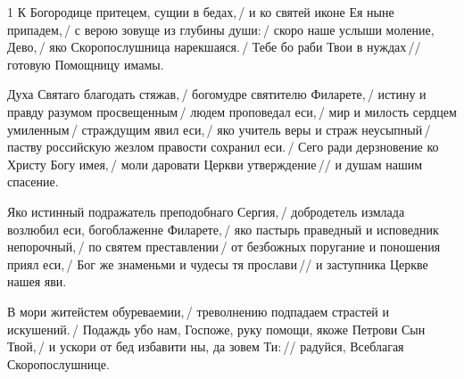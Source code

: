 


\begin{hangparas}{\hpindent}{1}
\large
{}
К Богородице притецем, сущии в бедах,\,/ и ко святей иконе
Ея ныне припадем,\,/ с верою зовуще из глубины души:\,/
скоро наше услыши моление, Дево,\,/ яко Скоропослушница
нарекшаяся.\,/ Тебе бо раби Твои в нуждах\,// готовую
Помощницу имамы.

Духа Святаго благодать стяжав,\,/ богомудре святителю
Филарете,\,/ истину и правду разумом просвещенным\,/ людем
проповедал еси,\,/ мир и милость сердцем умиленным\,/
страждущим явил еси,\,/ яко учитель веры и страж
неусыпный\,/ паству российскую жезлом правости сохранил
еси.\,/ Сего ради дерзновение ко Христу Богу имея,\,/ моли
даровати Церкви утверждение\,// и душам нашим спасение.

Яко истинный подражатель преподобнаго Сергия,\,/ добродетель
измлада возлюбил еси, богоблаженне Филарете,\,/ яко
пастырь праведный и исповедник непорочный,\,/ по святем
преставлении\,/ от безбожных поругание и поношения приял
еси,\,/ Бог же знаменьми и чудесы тя прослави\,// и
заступника Церкве нашея яви.

В мори житейстем обуреваемии,\,/ треволнению подпадаем
страстей и искушений.\,/ Подаждь убо нам, Госпоже, руку
помощи, якоже Петрови Сын Твой,\,/ и ускори от бед избавити
ны, да зовем Ти:\,// радуйся, Всеблагая Скоропослушнице.

\end{hangparas}

